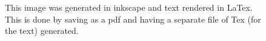 
\begin{figure}[tbp]
	\centering
	\def\svgwidth{0.5\linewidth}
	
	\caption[short caption]{\label{fig:label}
		This image was generated in inkscape and text rendered in LaTex.
		This is done by saving as a pdf and having a separate file of Tex (for the text) generated.
	}
\end{figure}
